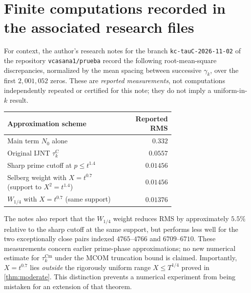 \documentclass[11pt,a4paper]{article}
\numberwithin{equation}{section}
\theoremstyle{definition}
\theoremstyle{remark}
\newcommand{\Cm}{\mathrm{Cm}}
\begin{document}
\section{Finite computations recorded in the associated research files}\label{sec:data}
For context, the author's research notes \cite{CasanaNotes} for the branch
\texttt{kc-tauC-2026-11-02} of the repository \texttt{vcasana1/prueba}
record the following root-mean-square discrepancies, normalized by the mean spacing between successive $\gamma_k$, over the first $2{,}001{,}052$ zeros. These are \emph{reported measurements}, not computations independently repeated or certified for this note; they do not imply a uniform-in-$k$ result.
\begin{center}
\begin{tabular}{@{}p{0.68\linewidth}r@{}}
\toprule
Approximation scheme & Reported RMS \\
\midrule
Main term $N_0$ alone & $0.332$\\
Original IJNT $\tau_k^{\mathrm C}$ & $0.0557$\\
Sharp prime cutoff at $p\le t^{1.4}$ & $0.01456$\\
Selberg weight with $X=t^{0.7}$ (support to $X^2=t^{1.4}$) & $0.01456$\\
$W_{1/4}$ with $X=t^{0.7}$ (same support) & $\mathbf{0.01376}$\\
\bottomrule
\end{tabular}
\end{center}
The notes also report that the $W_{1/4}$ weight reduces RMS by approximately $5.5\%$ relative to the sharp cutoff at the same support, but performs less well for the two exceptionally close pairs indexed $4765$--$4766$ and $6709$--$6710$. These measurements concern earlier prime-phase approximations; no new numerical estimate for $\tau_k^{\Cm}$ under the MCOM truncation bound is claimed. Importantly, $X=t^{0.7}$ lies \emph{outside} the rigorously uniform range $X\le T^{1/4}$ proved in \cref{thm:moderate}. This distinction prevents a numerical experiment from being mistaken for an extension of that theorem.
\end{document}
